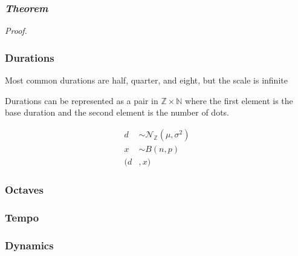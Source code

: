 \documentclass{beamer}
\begin{document}
\begin{frame}
\frametitle{{\it Theorem}}
{\it Proof.}
\end{frame}

\begin{frame}
\frametitle{Durations}
Most common durations are half, quarter, and eight, but the scale is infinite
\vspace{1em}

Durations can be represented as a pair in $\mathbb{Z} \times \mathbb{N}$ where
the first element is the base duration and the second element is the number of
dots.

\begin{align*}
d &\sim \mathcal{N}_{\mathbb{Z}}(\mu,\sigma^2)\\
x &\sim B(n,p)\\
(d&,x)
\end{align*}
\end{frame}

\begin{frame}
\frametitle{Octaves}
\end{frame}

\begin{frame}
\frametitle{Tempo}
\end{frame}

\begin{frame}
\frametitle{Dynamics}
\end{frame}
\end{document}
